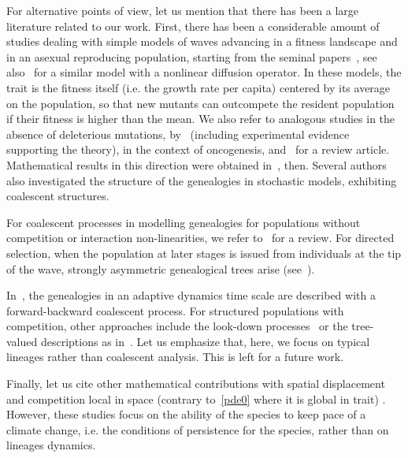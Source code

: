 \documentclass[10pt]{amsart}
\theoremstyle{definition}\newtheorem{defi}[theo]{Definition}\newtheorem{rema}[theo]{Remark}\newtheorem{exam}[theo]{Example}\newtheorem{exem}[theo]{Example}\newtheorem{nota}[theo]{Notation}
\begin{document}
\vspace{6pt}

For alternative points of view, let us mention that there has been a large literature related to our work. First, there has been a considerable amount of studies dealing with simple models of waves advancing in a fitness landscape and in an asexual reproducing population, starting from the seminal papers~\cite{kessler_evolution_1997,tsimring_rna_1996}, see also~\cite{rouzine_solitary_2003} for a similar model with a nonlinear diffusion operator. In these models, the trait is the fitness itself (i.e. the growth rate per capita) centered by its average on the population, so that new mutants can outcompete the resident population if their fitness is higher than the mean. We also refer to analogous studies in the absence of deleterious mutations, by~\cite{desai_speed_2007} (including experimental evidence supporting the theory), \cite{beerenwinkel_genetic_2007} in the context of oncogenesis, and~\cite{park_speed_2010} for a review article. Mathematical results in this direction were obtained in~\cite{durrett_traveling_2011}, then\linebreak \cite{schweinsberg_rigorous_2017}. Several authors also investigated the structure of the genealogies in stochastic models, exhibiting coalescent structures.

For coalescent processes in modelling genealogies for populations without competition or interaction non-linearities, we refer to~\cite{berestycki_recent_nodate} for a review. For directed selection, when the population at later stages is issued from individuals at the tip of the wave, strongly asymmetric genealogical trees arise (see~\cite{berestyckiberestyckischweinsberg,brunet_effect_2007, brunet_genealogies_2013, desai_genetic_2013, neher_genealogies_2013,schweinsberg_rigorous_2017-1}).

In~\cite{lepersbilliardportemeleardtran}, the genealogies in an adaptive dynamics time scale are described with a forward-backward coalescent process. For structured populations with competition, other approaches include the look-down processes~\cite{donnellykurtz_96,donnellykurtz_99,etheridgekurtz} or the tree-valued descriptions as in~\cite{blancasbenitezguflerkliemtranwakolbinger,grevenpfaffelhuberwinter2009,kliemwinter}. Let us emphasize that, here, we focus on typical lineages rather than coalescent analysis. This is left for a future work.

Finally, let us cite other mathematical contributions with spatial displacement and competition local in space (contrary to~\eqref{pde0} where it is global in trait) \cite{alfaro_effect_2017,berestycki_can_2009,loarie_velocity_2009, potapov_climate_2004}. However, these studies focus on the ability of the species to keep pace of a climate change, i.e. the conditions of persistence for the species, rather than on lineages dynamics.
\end{document}

